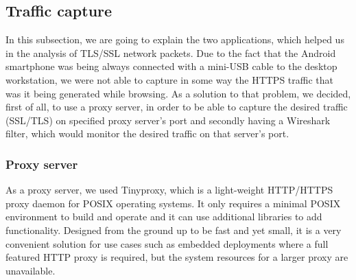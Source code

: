 \documentclass[12pt, a4paper]{report}
\begin{document}
\subsection{Traffic capture}

In this subsection, we are going to explain the two applications, which helped us in the analysis of TLS/SSL network packets. Due to the fact that the Android smartphone was being always connected with a mini-USB cable to the desktop workstation, we were not able to capture in some way the HTTPS traffic that was it being generated while browsing. As a solution to that problem, we decided, first of all, to use a proxy server, in order to be able to capture the desired traffic (SSL/TLS) on specified proxy server's port and secondly having a Wireshark filter, which would monitor the desired traffic on that server's port. 

\subsubsection{Proxy server}

As a proxy server, we used Tinyproxy, which is a light-weight HTTP/HTTPS proxy daemon for POSIX operating systems. It only requires a minimal POSIX environment to build and operate and it can use additional libraries to add functionality. Designed from the ground up to be fast and yet small, it is a very convenient solution for use cases such as embedded deployments where a full featured HTTP proxy is required, but the system resources for a larger proxy are unavailable.
\end{document}
